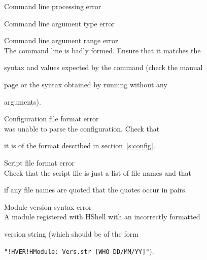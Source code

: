 \begin{itemize}
\begin{itemize}
\end{itemize}










\begin{itemize}


    Command line processing error


    Command line argument type error


    Command line argument range error\\


        The command line is badly formed.  Ensure that it matches the 


        syntax and values expected by the command (check the manual 


        page or the syntax obtained by running  without any


        arguments).





    Configuration file format error\\


         was unable to parse the configuration. Check that


        it is of the format described in section~\ref{s:config}.





    Script file format error\\


        Check that the script file is just a list of file names and that


        if any file names are quoted that the quotes occur in pairs.





    Module version syntax error\\


        A module registered with HShell with an incorrectly formatted


        version string (which should be of the form


        \texttt{"!HVER!HModule: Vers.str [WHO DD/MM/YY]"}).






\end{itemize}
\end{itemize}
